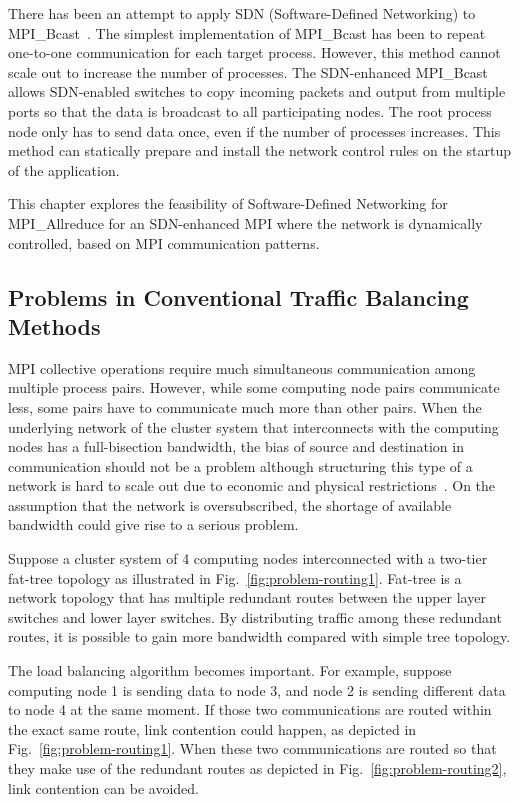 There has been an attempt to apply SDN (Software-Defined Networking) to
MPI\_Bcast~\autocite{Dashdavaa2013}. The simplest implementation of MPI\_Bcast has
been to repeat one-to-one communication for each target process. However, this
method cannot scale out to increase the number of processes. The SDN-enhanced
MPI\_Bcast allows SDN-enabled switches to copy incoming packets and output
from multiple ports so that the data is broadcast to all participating nodes.
The root process node only has to send data once, even if the number of
processes increases. This method can statically prepare and install the
network control rules on the startup of the application.

This chapter explores the feasibility of Software-Defined Networking for
MPI\_Allreduce for an SDN-enhanced MPI where the network is dynamically
controlled, based on MPI communication patterns.

\subsection{Problems in Conventional Traffic Balancing Methods}

MPI collective operations require much simultaneous communication among
multiple process pairs. However, while some computing node pairs
communicate less, some pairs have to communicate much more than other
pairs. When the underlying network of the cluster system that
interconnects with the computing nodes has a full-bisection bandwidth,
the bias of source and destination in communication should not be a
problem although structuring this type of a network is hard to scale out
due to economic and physical restrictions~\autocite{Al-Fares2008}. On the
assumption that the network is oversubscribed, the shortage of available
bandwidth could give rise to a serious problem.

Suppose a cluster system of 4 computing nodes interconnected with a
two-tier fat-tree topology as illustrated in Fig.~\ref{fig:problem-routing1}.
Fat-tree is a network topology that has multiple redundant routes between the
upper layer switches and lower layer switches. By distributing traffic among
these redundant routes, it is possible to gain more bandwidth compared with
simple tree topology.

The load balancing algorithm becomes important. For example, suppose
computing node 1 is sending data to node 3, and node 2 is sending
different data to node 4 at the same moment. If those two communications
are routed within the exact same route, link contention could happen, as
depicted in Fig.~\ref{fig:problem-routing1}. When these two
communications are routed so that they make use of the redundant routes
as depicted in Fig.~\ref{fig:problem-routing2}, link contention can be
avoided.

